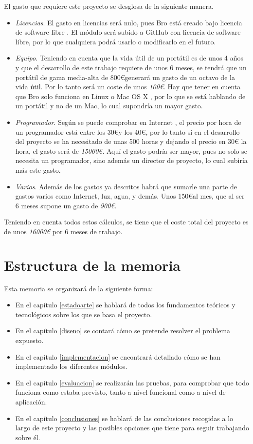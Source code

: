 El gasto que requiere este proyecto se desglosa de la siguiente manera.
\begin{itemize}
\item \textit{Licencias}. El gasto en licencias será nulo, pues Bro está creado bajo licencia de software libre \cite{broindex}. El 
módulo será subido a GitHub \cite{repo} con licencia de software libre, por lo que cualquiera podrá usarlo o modificarlo en el futuro.
\item \textit{Equipo}. Teniendo en cuenta que la vida útil de un portátil es de unos 4 años y que el desarrollo de este trabajo 
requiere de unos 6 meses, se tendrá que un portátil de gama media-alta de 800\euro generará un gasto de un octavo de la vida útil. Por 
lo tanto será un coste de unos \textit{100\euro}. Hay que tener en cuenta que Bro solo funciona en Linux o Mac OS X 
\cite{brodownload}, por lo que se está hablando de un portátil y no de un Mac, lo cual supondría un mayor gasto.
\item \textit{Programador}. Según se puede comprobar en Internet \cite{tarifa}, el precio por hora de un programador está entre los 
30\euro y los 40\euro, por lo tanto si en el desarrollo del proyecto se ha necesitado de unas 500 horas y dejando el precio en 30\euro 
la hora, el gasto será de \textit{15000\euro}. Aquí el gasto podría ser mayor, pues no solo se necesita un programador, sino además un 
director de proyecto, lo cual subiría más este gasto.
\item \textit{Varios}. Además de los gastos ya descritos habrá que sumarle una parte de gastos varios como Internet, luz, agua, y 
demás. Unos 150\euro al mes, que al ser 6 meses supone un gasto de \textit{900\euro}.
\end{itemize}

\intro Teniendo en cuenta todos estos cálculos, se tiene que el coste total del proyecto es de unos \textit{16000\euro} por 6 meses de 
trabajo.

\section{Estructura de la memoria}

Esta memoria se organizará de la siguiente forma: 
\begin{itemize}
\item En el capítulo \ref{estadoarte} se hablará de todos los fundamentos teóricos y tecnológicos sobre los que se 
basa el proyecto.
\item En el capítulo \ref{diseno} se contará cómo se pretende resolver el problema expuesto.
\item En el capítulo \ref{implementacion} se encontrará detallado cómo se han implementado los diferentes módulos.
\item En el capítulo \ref{evaluacion} se realizarán las pruebas, para comprobar que todo funciona como 
estaba previsto, tanto a nivel funcional como a nivel de aplicación.
\item En el capítulo \ref{conclusiones} se hablará de las conclusiones recogidas a lo largo de este proyecto y las posibles 
opciones que tiene para seguir trabajando sobre él.
\end{itemize}

